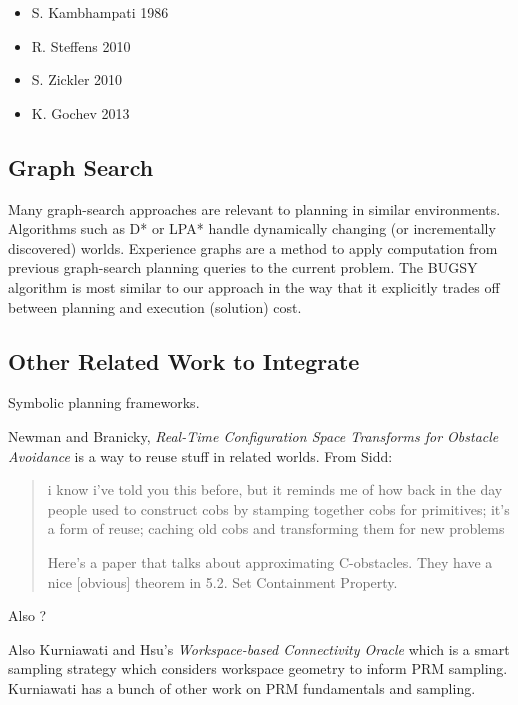 \noindent
\begin{itemize}
\item S. Kambhampati 1986
\item R. Steffens 2010
\item S. Zickler 2010
\item K. Gochev 2013
\end{itemize}

\subsection{Graph Search}

Many graph-search approaches are relevant to planning in similar
environments.
Algorithms such as
D* \cite{stentz1994dstar}
or LPA* \cite{koenig2004lpastar}
handle dynamically changing (or incrementally discovered) worlds.
Experience graphs \cite{phillips2012egraphs} are a method to apply
computation from previous graph-search planning queries
to the current problem.
The \textsc{BUGSY} algorithm \cite{ruml2007bugsy}
is most similar to our approach in the way that it explicitly
trades off between planning and execution (solution) cost.

\subsection{Other Related Work to Integrate}

Symbolic planning frameworks.

Newman and Branicky,
\emph{Real-Time Configuration Space Transforms for Obstacle Avoidance}
\cite{newmanbranicky1991cspacetransforms}
is a way to reuse stuff in related worlds.
From Sidd:
\begin{quote}
i know i've told you this before,
but it reminds me of how back in the day
people used to construct cobs
by stamping together cobs for primitives;
it's a form of reuse;
caching old cobs and transforming them for new problems

Here's a paper that talks about approximating C-obstacles.
They have a nice [obvious] theorem in 5.2. Set Containment Property.
\end{quote}

Also \cite{kavraki1995cspacefft}?

Also Kurniawati and Hsu's
\emph{Workspace-based Connectivity Oracle}
\cite{kurniawati2008workconnoracle}
which is a smart sampling strategy which considers workspace
geometry to inform PRM sampling.
Kurniawati has a bunch of other work on PRM fundamentals and sampling.

